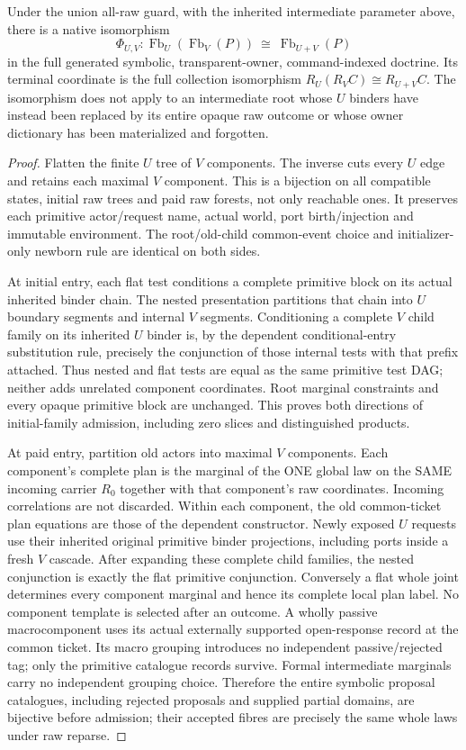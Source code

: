 \documentclass[11pt]{article}
\begin{document}
\begin{theorem}
Under the union all-raw guard, with the inherited intermediate parameter above, there is a native isomorphism
\[
 \Phi_{U,V}:\operatorname{Fb}_U(\operatorname{Fb}_V(P))
       \ \cong\ \operatorname{Fb}_{U+V}(P)
\]
in the full generated symbolic, transparent-owner, command-indexed doctrine. Its terminal coordinate is the full collection isomorphism
$R_U(R_VC)\cong R_{U+V}C$. The isomorphism does not apply to an intermediate root whose $U$ binders have instead been replaced by its entire opaque raw outcome or whose owner dictionary has been materialized and forgotten.
\end{theorem}
\begin{proof}
Flatten the finite $U$ tree of $V$ components. The inverse cuts every $U$ edge and retains each maximal $V$ component. This is a bijection on all compatible states, initial raw trees and paid raw forests, not only reachable ones. It preserves each primitive actor/request name, actual world, port birth/injection and immutable environment. The root/old-child common-event choice and initializer-only newborn rule are identical on both sides.

At initial entry, each flat test conditions a complete primitive block on its actual inherited binder chain. The nested presentation partitions that chain into $U$ boundary segments and internal $V$ segments. Conditioning a complete $V$ child family on its inherited $U$ binder is, by the dependent conditional-entry substitution rule, precisely the conjunction of those internal tests with that prefix attached. Thus nested and flat tests are equal as the same primitive test DAG; neither adds unrelated component coordinates. Root marginal constraints and every opaque primitive block are unchanged. This proves both directions of initial-family admission, including zero slices and distinguished products.

At paid entry, partition old actors into maximal $V$ components. Each component's complete plan is the marginal of the ONE global law on the SAME incoming carrier $R_0$ together with that component's raw coordinates. Incoming correlations are not discarded. Within each component, the old common-ticket plan equations are those of the dependent constructor. Newly exposed $U$ requests use their inherited original primitive binder projections, including ports inside a fresh $V$ cascade. After expanding these complete child families, the nested conjunction is exactly the flat primitive conjunction. Conversely a flat whole joint determines every component marginal and hence its complete local plan label. No component template is selected after an outcome. A wholly passive macrocomponent uses its actual externally supported open-response record at the common ticket. Its macro grouping introduces no independent passive/rejected tag; only the primitive catalogue records survive. Formal intermediate marginals carry no independent grouping choice. Therefore the entire symbolic proposal catalogues, including rejected proposals and supplied partial domains, are bijective before admission; their accepted fibres are precisely the same whole laws under raw reparse.


\end{proof}
\end{document}
